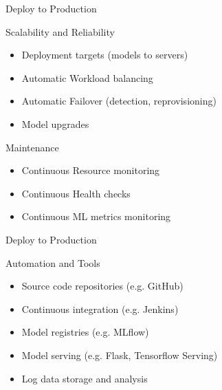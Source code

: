 \documentclass[ignorenonframetext,xcolor=x11names]{beamer}
\begin{document}
\begin{frame}{Deploy to Production}
\begin{block}{Scalability and Reliability} 
\begin{itemize}
   \item Deployment targets (models to servers)
   \item Automatic Workload balancing
   \item Automatic Failover (detection, reprovisioning)
   \item Model upgrades
\end{itemize}
\end{block}
\begin{block}{Maintenance}
\begin{itemize}
   \item Continuous Resource monitoring
   \item Continuous Health checks
   \item Continuous ML metrics monitoring
\end{itemize}
\end{block}
\end{frame}

\begin{frame}{Deploy to Production}
\begin{block}{Automation and Tools}
\begin{itemize}
   \item Source code repositories (e.g. GitHub)
   \item Continuous integration (e.g. Jenkins)
   \item Model registries (e.g. MLflow)
   \item Model serving (e.g. Flask, Tensorflow Serving) 
   \item Log data storage and analysis
\end{itemize}
\end{block}
\end{frame}

\end{document}
